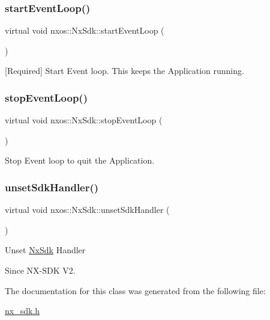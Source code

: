 \subsubsection{\texorpdfstring{start\+Event\+Loop()}{startEventLoop()}}
{\footnotesize\ttfamily virtual void nxos\+::\+Nx\+Sdk\+::start\+Event\+Loop (\begin{DoxyParamCaption}{ }\end{DoxyParamCaption})\hspace{0.3cm}{\ttfamily [pure virtual]}}

\mbox{[}Required\mbox{]} Start Event loop. This keeps the Application running. \mbox{\label{classnxos_1_1_nx_sdk_adc80e6f244a7cbc050f9dacbc8018315}} 
\subsubsection{\texorpdfstring{stop\+Event\+Loop()}{stopEventLoop()}}
{\footnotesize\ttfamily virtual void nxos\+::\+Nx\+Sdk\+::stop\+Event\+Loop (\begin{DoxyParamCaption}{ }\end{DoxyParamCaption})\hspace{0.3cm}{\ttfamily [pure virtual]}}

Stop Event loop to quit the Application. \mbox{\label{classnxos_1_1_nx_sdk_ad86348d2475862e149dcdbe04634db3b}} 
\subsubsection{\texorpdfstring{unset\+Sdk\+Handler()}{unsetSdkHandler()}}
{\footnotesize\ttfamily virtual void nxos\+::\+Nx\+Sdk\+::unset\+Sdk\+Handler (\begin{DoxyParamCaption}{ }\end{DoxyParamCaption})\hspace{0.3cm}{\ttfamily [pure virtual]}}

Unset \mbox{\hyperlink{classnxos_1_1_nx_sdk}{Nx\+Sdk}} Handler

\begin{DoxySince}{Since}
N\+X-\/\+S\+DK V2. 
\end{DoxySince}


The documentation for this class was generated from the following file\+:\begin{DoxyCompactItemize}
\item 
\mbox{\hyperlink{nx__sdk_8h}{nx\+\_\+sdk.\+h}}\end{DoxyCompactItemize}
